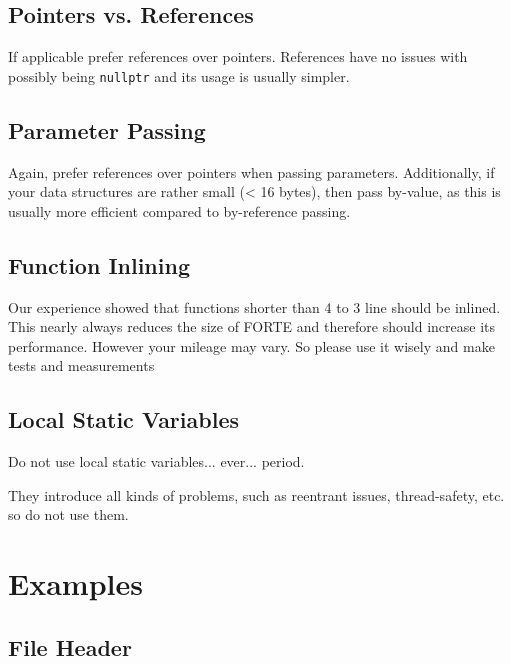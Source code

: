 \documentclass[final,a4paper,10pt, oneside]{article}
\begin{document}
\subsection{Pointers vs. References}
If applicable prefer references over pointers.
References have no issues with possibly being \verb|nullptr| and its usage is usually simpler.

\subsection{Parameter Passing}
Again, prefer references over pointers when passing parameters.
Additionally, if your data structures are rather small (< 16 bytes), then pass by-value, as this is usually more efficient compared to by-reference passing.


\subsection{Function Inlining}
Our experience showed that functions shorter than 4 to 3 line should be inlined. This nearly always reduces the size of FORTE and therefore should increase its performance. However your mileage may vary. So please use it wisely and make tests and measurements


\subsection{Local Static Variables}
Do not use local static variables... ever... period.

They introduce all kinds of problems, such as reentrant issues, thread-safety, etc. so do not use them.

\appendix
\section{Examples}
\subsection{File Header} \label{subsec:FileHeader}
\end{document}
